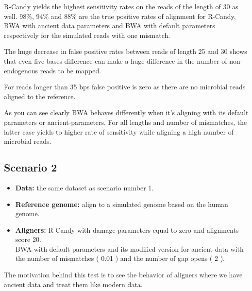\documentclass[11pt,a4paper]{report}
\begin{document}

R-Candy yields the highest sensitivity rates on the reads of the length of 30 as well. 
98\%, 94\% and 88\% are the true positive rates of alignment for R-Candy, 
BWA with ancient data parameters and BWA with default parameters respectively 
for the simulated reads with one mismatch. 

The huge decrease in false positive rates between reads of length 25 and 30 
shows that even five bases difference can make a huge difference in the number of 
non-endogenous reads to be mapped.

For reads longer than 35 bps false positive is zero as there are no microbial 
reads aligned to the reference.

As you can see clearly BWA behaves differently when it's aligning with its default 
parameters or ancient-parameters. For all lengths and number of mismatches, the 
latter case yields to higher rate of sensitivity while aligning a high number of 
microbial reads.

\subsection{Scenario 2}

 
 \begin{itemize}
   \item \textbf{Data:} the same dataset as scenario number 1.
   
   \item \textbf{Reference genome:} align to a simulated genome based
 on the human genome.

    \item \textbf{Aligners:} R-Candy with damage parameters equal to zero and alignments score 20. \\
BWA with default parameters and its modified version for ancient data with the number of mismatches ( 0.01 ) and the number of gap opens ( 2 ).
  
  \end{itemize}
 
The motivation behind this test is to see the behavior of aligners
where we have ancient data and treat them like modern data.
\end{document}

